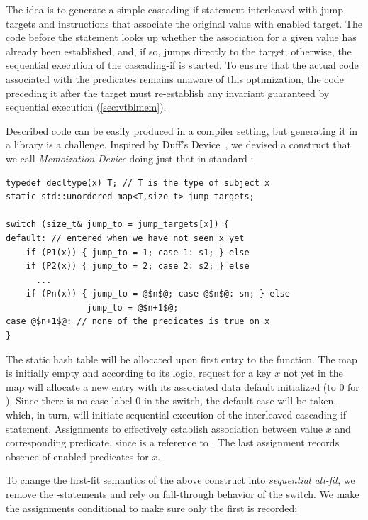 The idea is to generate a simple cascading-if statement interleaved with jump 
targets and instructions that associate the original value with enabled target. 
The code before the statement looks up whether the association for a given value 
has already been established, and, if so, jumps directly to the target; otherwise, 
the sequential execution of the cascading-if is started. To ensure 
that the actual code associated with the predicates remains unaware of this 
optimization, the code preceding it after the target must re-establish any 
invariant guaranteed by sequential execution (\textsection\ref{sec:vtblmem}).

Described code can be easily produced in a compiler setting, but generating it in 
a library is a challenge. Inspired by Duff's Device~\cite{Duff}, 
we devised a construct that we call \emph{Memoization Device} doing just 
that in standard \Cpp{}:

\begin{lstlisting}
typedef decltype(x) T; // T is the type of subject x
static std::unordered_map<T,size_t> jump_targets;

switch (size_t& jump_to = jump_targets[x]) {
default: // entered when we have not seen x yet
    if (P1(x)) { jump_to = 1; case 1: s1; } else 
    if (P2(x)) { jump_to = 2; case 2: s2; } else
      ...
    if (Pn(x)) { jump_to = @$n$@; case @$n$@: sn; } else
                jump_to = @$n+1$@;
case @$n+1$@: // none of the predicates is true on x
}
\end{lstlisting}

\noindent
The static  hash table will be allocated upon first entry 
to the function. The map is initially empty and according to its logic, 
request for a key $x$ not yet in the map will allocate a 
new entry with its associated data default initialized (to 0 for ). Since 
there is no case label 0 in the switch, the default case will be taken, which, in 
turn, will initiate sequential execution of the interleaved cascading-if 
statement. Assignments to  effectively establish association 
between value $x$ and corresponding predicate, since  is a 
reference to . The last assignment records absence of 
enabled predicates for $x$.

To change the first-fit semantics of the above construct into \emph{sequential 
all-fit}, we remove the -statements and rely on fall-through behavior of the 
switch. We make the assignments conditional to make sure only the first is recorded:

